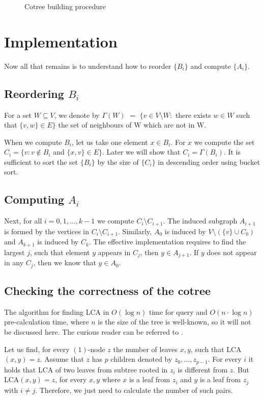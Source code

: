 \begin{figure}
    \centering
    
    \caption{Cotree building procedure}
    \label{fig:cotree_build}
\end{figure}




\section{Implementation}
Now all that remains is to understand how to reorder $\{B_i\}$ and compute $\{A_i\}$.
\subsection{Reordering $B_i$}
\begin{definition}
    For a set $W \subseteq V$, we denote by \emph{$\Gamma(W)$} $=$ $\{v \in V \setminus W \colon$ there exists $w \in W$ such that $\{v,w\} \in E\}$ the set of neighbours of W which are not in W.
\end{definition}
  

When we compute $B_i$, let us take one element $x \in B_i$. For $x$ we compute the set $C_i = \{v \colon v \notin B_i $ and $\{x,v\} \in E \}$. Later we will show that $C_i=\Gamma{(B_i)}$. It is sufficient to sort the set $\{B_i\}$ by the size of $\{C_i\}$ in descending order using bucket sort.
\subsection{Computing $A_i$}
\label{compute_a}
Next, for all $i = 0,1,\ldots,k-1$ we compute $C_i \setminus C_{i+1}$. The induced subgraph $A_{i+1}$ is formed by the vertices in $C_i \setminus C_{i+1}$. Similarly, $A_0$ is induced by $V \setminus (\{v\} \cup C_0)$ and $A_{k+1}$ is induced by $C_{k}$.
The effective implementation requires to find the largest $j$, such that element $y$ appears in $C_j$, then $y \in A_{j+1}$. If $y$ does not appear in any $C_j$, then we know that $y \in A_0$.
\subsection{Checking the correctness of the cotree}
The algorithm for finding LCA in $O(\log{n})$ time for query and $O(n \cdot \log{n})$ pre-calculation time, where $n$ is the size of the tree is well-known, so it will not be discussed here. The curious reader can be referred to \cite{LCA}.

Let us find, for every $(1)$-node $z$ the number of leaves $x, y$, such that LCA$(x,y)=z$. Assume that $z$ has $p$ children denoted by $z_0,\ldots,z_{p-1}$. For every $i$ it holds that LCA of two leaves from subtree rooted in $z_i$ is different from $z$. But LCA$(x,y)=z$, for every $x, y$ where $x$ is a leaf from $z_i$ and $y$ is a leaf from $z_j$ with $i \neq j$. Therefore, we just need to calculate the number of such pairs.

